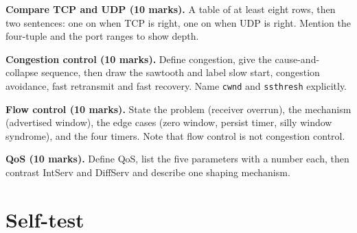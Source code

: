 \documentclass[11pt,a4paper]{article}
\begin{document}
\begin{answerbox}
\textbf{Compare TCP and UDP (10 marks).} A table of at least eight rows, then two sentences: one on when TCP is right, one on when UDP is right. Mention the four-tuple and the port ranges to show depth.
\end{answerbox}

\begin{answerbox}
\textbf{Congestion control (10 marks).} Define congestion, give the cause-and-collapse sequence, then draw the sawtooth and label slow start, congestion avoidance, fast retransmit and fast recovery. Name \texttt{cwnd} and \texttt{ssthresh} explicitly.
\end{answerbox}

\begin{answerbox}
\textbf{Flow control (10 marks).} State the problem (receiver overrun), the mechanism (advertised window), the edge cases (zero window, persist timer, silly window syndrome), and the four timers. Note that flow control is not congestion control.
\end{answerbox}

\begin{answerbox}
\textbf{QoS (10 marks).} Define QoS, list the five parameters with a number each, then contrast IntServ and DiffServ and describe one shaping mechanism.
\end{answerbox}

\section{Self-test}
\end{document}
